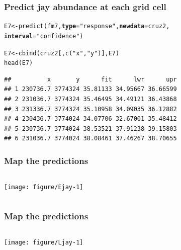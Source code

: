 \documentclass[color=usenames,dvipsnames]{beamer}\usepackage[]{graphicx}\usepackage[]{color}
\makeatletter
\newcommand{\hlstr}[1]{\textcolor[rgb]{0.749,0.012,0.012}{#1}}%
\newcommand{\hlstd}[1]{\textcolor[rgb]{0,0,0}{#1}}%
\newcommand{\hlkwb}[1]{\textcolor[rgb]{0,0.341,0.682}{#1}}%
\newcommand{\hlkwc}[1]{\textcolor[rgb]{0,0,0}{\textbf{#1}}}%
\newcommand{\hlkwd}[1]{\textcolor[rgb]{0.004,0.004,0.506}{#1}}%
\newenvironment{kframe}{%
 \def\at@end@of@kframe{}%
 \ifinner\ifhmode%
  \def\at@end@of@kframe{\end{minipage}}%
  \begin{minipage}{\columnwidth}%
 \fi\fi%
 \def\FrameCommand##1{\hskip\@totalleftmargin \hskip-\fboxsep
 \colorbox{shadecolor}{##1}\hskip-\fboxsep
     \hskip-\linewidth \hskip-\@totalleftmargin \hskip\columnwidth}%
 \MakeFramed {\advance\hsize-\width
   \@totalleftmargin\z@ \linewidth\hsize
   \@setminipage}}%
 {\par\unskip\endMakeFramed%
 \at@end@of@kframe}
\newenvironment{knitrout}{}{} %
\makeatother
\begin{document}
\begin{frame}[fragile]
  \frametitle{Predict jay abundance at each grid cell}
\begin{knitrout}
\color{fgcolor}\begin{kframe}
\begin{alltt}
\hlstd{E7} \hlkwb{<-} \hlkwd{predict}\hlstd{(fm7,} \hlkwc{type}\hlstd{=}\hlstr{"response"}\hlstd{,} \hlkwc{newdata}\hlstd{=cruz2,}
              \hlkwc{interval}\hlstd{=}\hlstr{"confidence"}\hlstd{)}
\end{alltt}
\end{kframe}
\end{knitrout}
\pause
\begin{knitrout}
\color{fgcolor}\begin{kframe}
\begin{alltt}
\hlstd{E7} \hlkwb{<-} \hlkwd{cbind}\hlstd{(cruz2[,}\hlkwd{c}\hlstd{(}\hlstr{"x"}\hlstd{,}\hlstr{"y"}\hlstd{)], E7)}
\hlkwd{head}\hlstd{(E7)}
\end{alltt}
\begin{verbatim}
##          x       y      fit      lwr      upr
## 1 230736.7 3774324 35.81133 34.95667 36.66599
## 2 231036.7 3774324 35.46495 34.49121 36.43868
## 3 231336.7 3774324 35.10958 34.09035 36.12882
## 4 230436.7 3774024 34.07706 32.67001 35.48412
## 5 230736.7 3774024 38.53521 37.91238 39.15803
## 6 231036.7 3774024 38.08461 37.46267 38.70655
\end{verbatim}
\end{kframe}
\end{knitrout}
\end{frame}


\begin{frame}[fragile]
  \frametitle{Map the predictions}
  \scriptsize

\begin{columns}
  \column{\dimexpr\paperwidth-10pt}
  \texttt{[image: figure/Ejay-1]}
\end{columns}
\end{frame}




\begin{frame}[fragile]
  \frametitle{Map the predictions}
  \scriptsize

\begin{columns}
  \column{\dimexpr\paperwidth-10pt}
  \texttt{[image: figure/Ljay-1]}
\end{columns}
\end{frame}
\end{document}
